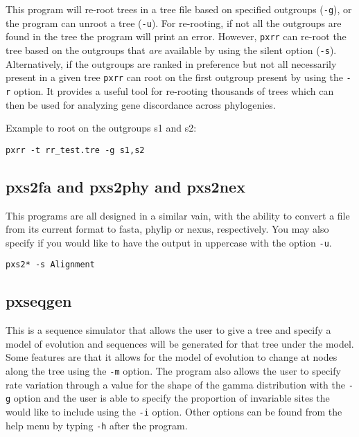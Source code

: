 \documentclass[12pt,letterpaper]{memoir}
\begin{document}
This program will re-root trees in a tree file based on specified outgroups (\texttt{-g}), or the program can unroot a tree (\texttt{-u}). For re-rooting, if not all the outgroups are found in the tree the program will print an error. However, \texttt{pxrr} can re-root the tree based on the outgroups that \textit{are} available by using the silent option (\texttt{-s}). Alternatively, if the outgroups are ranked in preference but not all necessarily present in a given tree \texttt{pxrr} can root on the first outgroup present by using the \texttt{-r} option. It provides a useful tool for re-rooting thousands of trees which can then be used for analyzing gene discordance across phylogenies.

\begin{flushleft}
Example to root on the outgroups s1 and s2:
\begin{verbatim}
pxrr -t rr_test.tre -g s1,s2
\end{verbatim}
\end{flushleft}

\subsection{pxs2fa and pxs2phy and  pxs2nex}

This programs are all designed in a similar vain, with the ability to convert a file from its current format to fasta, phylip or nexus, respectively. You may also specify if you would like to have the output in uppercase with the option \texttt{-u}.

\begin{flushleft}
\begin{verbatim}
pxs2* -s Alignment
\end{verbatim}
\end{flushleft}

\subsection{pxseqgen}

This is a sequence simulator that allows the user to give a tree and specify a model of evolution and sequences will be generated for that tree under the model. Some features are that it allows for the model of evolution to change at nodes along the tree using the \texttt{-m} option. The program also allows the user to specify rate variation through a value for the shape of the gamma distribution with the \texttt{-g} option and the user is able to specify the proportion of invariable sites the would like to include using the \texttt{-i} option. Other options can be found from the help menu by typing \texttt{-h} after the program.
\end{document}
